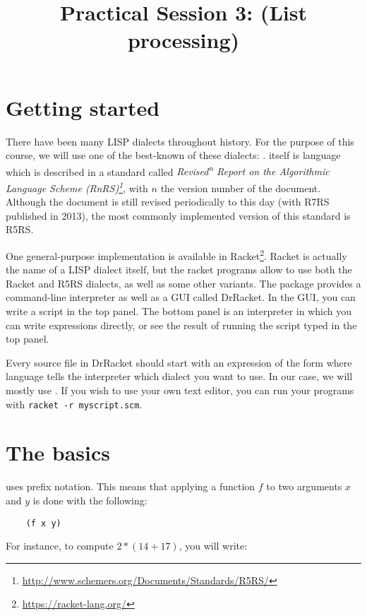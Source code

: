 \documentclass{../../../tp}
\title{Practical Session 3: \scheme (List processing)}
\author{}
\begin{document}
\maketitle

\section{Getting started}

There have been many LISP dialects throughout history. For the purpose of this course, we will use one of the best-known of these dialects: \scheme. \scheme itself is language which is described in a standard called \emph{Revised\textsuperscript{n} Report on the Algorithmic Language Scheme (RnRS)\footnote{\url{http://www.schemers.org/Documents/Standards/R5RS/}}}, with $n$ the version number of the document. Although the document is still revised periodically to this day (with R7RS published in 2013), the most commonly implemented version of this standard is R5RS. 

One general-purpose implementation is available in Racket\footnote{\url{https://racket-lang.org/}}. Racket is actually the name of a LISP dialect itself, but the racket programs allow to use both the Racket and \scheme R5RS dialects, as well as some other variants. The package provides a command-line interpreter as well as a GUI called DrRacket. In the GUI, you can write a script in the top panel. The bottom panel is an interpreter in which you can write expressions directly, or see the result of running the script typed in the top panel.

Every source file in DrRacket should start with an expression of the form  where language tells the interpreter which dialect you want to use. In our case, we will mostly use . If you wish to use your own text editor, you can run your programs with \verb|racket -r myscript.scm|.


\section{The basics}

\scheme uses prefix notation. This means that applying a function $f$ to two arguments $x$ and $y$ is done with the following:

\begin{verbatim}
	(f x y)
\end{verbatim}

For instance, to compute $2 * (14 + 17)$, you will write:
\end{document}
